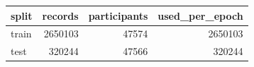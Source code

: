 \begin{tabular}{lrrr}
\toprule
split & records & participants & used_per_epoch \\
\midrule
train & 2650103 & 47574 & 2650103 \\
test & 320244 & 47566 & 320244 \\
\bottomrule
\end{tabular}
